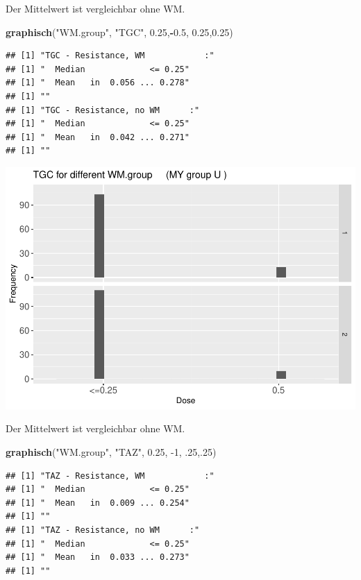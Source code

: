 \documentclass[
]{article}
\newenvironment{Shaded}{\begin{snugshade}}{\end{snugshade}}
\newcommand{\DecValTok}[1]{\textcolor[rgb]{0.00,0.00,0.81}{#1}}
\newcommand{\FloatTok}[1]{\textcolor[rgb]{0.00,0.00,0.81}{#1}}
\newcommand{\KeywordTok}[1]{\textcolor[rgb]{0.13,0.29,0.53}{\textbf{#1}}}
\newcommand{\NormalTok}[1]{#1}
\newcommand{\OperatorTok}[1]{\textcolor[rgb]{0.81,0.36,0.00}{\textbf{#1}}}
\newcommand{\StringTok}[1]{\textcolor[rgb]{0.31,0.60,0.02}{#1}}
\begin{document}
Der Mittelwert ist vergleichbar ohne WM.

\begin{Shaded}
\begin{Highlighting}[]
  \KeywordTok{graphisch}\NormalTok{(}\StringTok{"WM.group"}\NormalTok{, }\StringTok{"TGC"}\NormalTok{, }\FloatTok{0.25}\NormalTok{,}\OperatorTok{-}\FloatTok{0.5}\NormalTok{, }\FloatTok{0.25}\NormalTok{,}\FloatTok{0.25}\NormalTok{)  }
\end{Highlighting}
\end{Shaded}

\begin{verbatim}
## [1] "TGC - Resistance, WM            :"
## [1] "  Median             <= 0.25"
## [1] "  Mean   in  0.056 ... 0.278"
## [1] ""
## [1] "TGC - Resistance, no WM      :"
## [1] "  Median             <= 0.25"
## [1] "  Mean   in  0.042 ... 0.271"
## [1] ""
\end{verbatim}

\includegraphics{Verteilungen_files/figure-latex/unnamed-chunk-36-1.pdf}

Der Mittelwert ist vergleichbar ohne WM.

\begin{Shaded}
\begin{Highlighting}[]
  \KeywordTok{graphisch}\NormalTok{(}\StringTok{"WM.group"}\NormalTok{, }\StringTok{"TAZ"}\NormalTok{, }\FloatTok{0.25}\NormalTok{, }\DecValTok{-1}\NormalTok{, }\FloatTok{.25}\NormalTok{,.}\DecValTok{25}\NormalTok{)  }
\end{Highlighting}
\end{Shaded}

\begin{verbatim}
## [1] "TAZ - Resistance, WM            :"
## [1] "  Median             <= 0.25"
## [1] "  Mean   in  0.009 ... 0.254"
## [1] ""
## [1] "TAZ - Resistance, no WM      :"
## [1] "  Median             <= 0.25"
## [1] "  Mean   in  0.033 ... 0.273"
## [1] ""
\end{verbatim}
\end{document}
